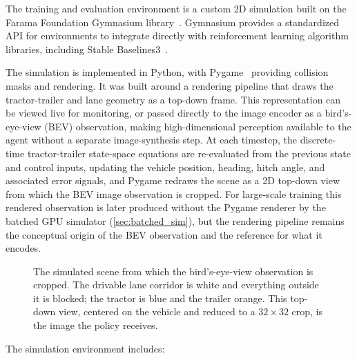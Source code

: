 The training and evaluation environment is a custom 2D simulation built on the Farama Foundation Gymnasium library~\cite{towers2024gymnasium}. Gymnasium provides a standardized API for environments to integrate directly with reinforcement learning algorithm libraries, including Stable Baselines3~\cite{raffin2021sb3}.

The simulation is implemented in Python, with Pygame~\cite{pygame} providing collision masks and rendering. It was built around a rendering pipeline that draws the tractor-trailer and lane geometry as a top-down frame. This representation can be viewed live for monitoring, or passed directly to the image encoder as a bird's-eye-view (BEV) observation, making high-dimensional perception available to the agent without a separate image-synthesis step. At each timestep, the discrete-time tractor-trailer state-space equations are re-evaluated from the previous state and control inputs, updating the vehicle position, heading, hitch angle, and associated error signals, and Pygame redraws the scene as a 2D top-down view from which the BEV image observation is cropped. For large-scale training this rendered observation is later produced without the Pygame renderer by the batched GPU simulator (\cref{sec:batched_sim}), but the rendering pipeline remains the conceptual origin of the BEV observation and the reference for what it encodes.

\begin{figure}[H]
  \centering
  \caption{The simulated scene from which the bird's-eye-view observation is cropped. The drivable lane corridor is white and everything outside it is blocked; the tractor is blue and the trailer orange. This top-down view, centered on the vehicle and reduced to a $32 \times 32$ crop, is the image the policy receives.}
  \label{fig:sim_bev}
\end{figure}

The simulation environment includes:


